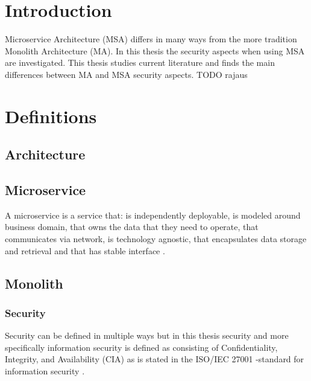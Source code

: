 


\section{Introduction}

Microservice Architecture (MSA) differs in many ways from 
the more tradition Monolith Architecture (MA).
In this thesis the security aspects when using MSA are investigated. 
This thesis studies current literature and finds the main differences between
MA and MSA security aspects. TODO rajaus






\section{Definitions}

\subsection{Architecture}




\subsection{Microservice}

A microservice is a service that: is independently deployable,
is modeled around business domain,
that owns the data that they need to operate,
that communicates via network,
is technology agnostic,
that encapsulates data storage and retrieval and 
that has stable interface \citep{newman2019}.

\subsection{Monolith}


\subsubsection{Security}

Security can be defined in multiple ways but in this thesis security 
and more specifically information security is defined as consisting of 
Confidentiality, Integrity, and Availability (CIA) as is stated in the 
ISO/IEC 27001 -standard for information security \citep{isoiec27001}.

